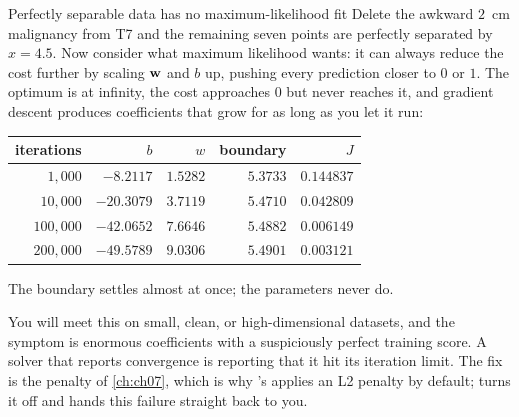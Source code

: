\begin{pitfall}{Perfectly separable data has no maximum-likelihood fit}
Delete the awkward $2$~cm malignancy from T7 and the remaining seven points are
perfectly separated by $x = 4.5$. Now consider what maximum likelihood wants: it
can always reduce the cost further by scaling $\mathbf{w}$ and $b$ up, pushing every
prediction closer to $0$ or $1$. The optimum is at infinity, the cost approaches
$0$ but never reaches it, and gradient descent produces coefficients that grow
for as long as you let it run:

\begin{center}
\small
\renewcommand{\arraystretch}{1.15}
\begin{tabular}{@{}rrrrr@{}}
\toprule
iterations & $b$ & $w$ & boundary & $J$\\
\midrule
$1{,}000$   & $-8.2117$  & $1.5282$ & $5.3733$ & $0.144837$\\
$10{,}000$  & $-20.3079$ & $3.7119$ & $5.4710$ & $0.042809$\\
$100{,}000$ & $-42.0652$ & $7.6646$ & $5.4882$ & $0.006149$\\
$200{,}000$ & $-49.5789$ & $9.0306$ & $5.4901$ & $0.003121$\\
\bottomrule
\end{tabular}
\end{center}

The boundary settles almost at once; the parameters never do.

You will meet this on small, clean, or high-dimensional datasets, and the symptom
is enormous coefficients with a suspiciously perfect training score. A solver
that reports convergence is reporting that it hit its iteration limit. The fix is the
penalty of \cref{ch:ch07}, which is why 's
 applies an L2 penalty by default; 
turns it off and hands this failure straight back to you.
\end{pitfall}


